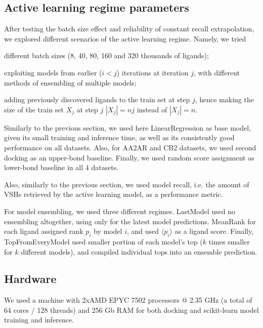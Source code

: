 \subsection{Active learning regime parameters}

After testing the batch size effect and reliability of constant recall extrapolation, we explored different scenarios of the active learning regime. Namely, we tried
\begin{enumerate*}[label=(\roman*)]
    \item different batch sizes (8, 40, 80, 160 and 320 thousands of ligands);
    \item exploiting models from earlier ($i < j$) iterations at iteration $j$, with different methods of ensembling of multiple models;
    \item adding previously discovered ligands to the train set at step $j$, hence making the size of the train set $X_j$ at step $j$ $|X_j| = nj$ instead of $|X_j|=n$.
\end{enumerate*}

Similarly to the previous section, we used here LinearRegression as base model, given its small training and inference time, as well as its consistently good performance on all datasets. Also, for AA2AR and CB2 datasets, we used second docking as an upper-bond baseline. Finally, we used random score assignment as lower-bond baseline in all 4 datasets. 

Also, similarly to the previous section, we used model recall, i.e. the amount of VSHs retrieved by the active learning model, as a performance metric.

For model ensembling, we used three different regimes. LastModel used no ensembling altogether, using only for the latest model predictions. MeanRank for each ligand assigned rank $p_i$ by model $i$, and used $\langle p_i \rangle$ as a ligand score. Finally, TopFromEveryModel used smaller portion of each model's top ($k$ times smaller for $k$ different models), and compiled individual tops into an ensemble prediction.


\subsection{Hardware}
We used a machine with 2xAMD EPYC 7502 processors @ 2.35 GHz (a total of 64 cores / 128 threads) and 256 Gb RAM for both docking and scikit-learn model training and inference.

